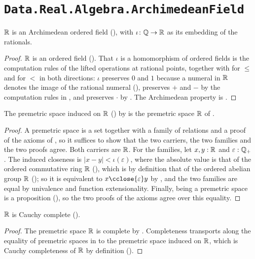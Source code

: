 \section{\texttt{Data.Real.Algebra.ArchimedeanField}}

\begin{theorem}
  \label{RArchimedeanField}
  $\mathbb{R}$ is an Archimedean ordered field (), with $\iota \colon \mathbb{Q} \to \mathbb{R}$ as its embedding of the rationals.
\end{theorem}
\begin{proof}
  $\mathbb{R}$ is an ordered field (). That $\iota$ is a homomorphism of ordered fields is the computation rules of the lifted operations at rational points, together with  for $\le$ and  for $<$ in both directions: $\iota$ preserves $0$ and $1$ because a numeral in $\mathbb{R}$ denotes the image of the rational numeral (), preserves $+$ and $-$ by the computation rules in , and preserves $\cdot$ by . The Archimedean property is .
\end{proof}

\begin{lemma}
  \label{inducedPremetricSpaceRealEq}
  The premetric space induced on $\mathbb{R}$ () by  is the premetric space $\mathbb{R}$ of .
\end{lemma}
\begin{proof}
  A premetric space is a set together with a family of relations and a proof of the axioms of , so it suffices to show that the two carriers, the two families and the two proofs agree. Both carriers are $\mathbb{R}$. For the families, let $x, y : \mathbb{R}$ and $\varepsilon : \mathbb{Q}_{+}$. The induced closeness is $\lvert x - y \rvert < \iota(\varepsilon)$, where the absolute value is that of the ordered commutative ring $\mathbb{R}$ (), which is by definition that of the ordered abelian group $\mathbb{R}$ (); so it is equivalent to $x \cclose{\varepsilon} y$ by , and the two families are equal by univalence and function extensionality. Finally, being a premetric space is a proposition (), so the two proofs of the axioms agree over this equality.
\end{proof}

\begin{theorem}
  \label{isCauchyCompleteReal}
  $\mathbb{R}$ is Cauchy complete ().
\end{theorem}
\begin{proof}
  The premetric space $\mathbb{R}$ is complete by . Completeness transports along the equality of premetric spaces in  to the premetric space induced on $\mathbb{R}$, which is Cauchy completeness of $\mathbb{R}$ by definition ().
\end{proof}
